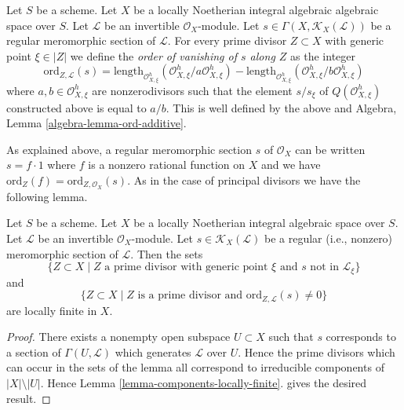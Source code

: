 \begin{definition}
\label{definition-order-vanishing-meromorphic}
Let $S$ be a scheme. Let $X$ be a locally Noetherian integral
algebraic algebraic space over $S$. Let $\mathcal{L}$ be an
invertible $\mathcal{O}_X$-module.
Let $s \in \Gamma(X, \mathcal{K}_X(\mathcal{L}))$
be a regular meromorphic section of $\mathcal{L}$.
For every prime divisor $Z \subset X$ with generic point $\xi \in |Z|$
we define the
{\it order of vanishing of $s$ along $Z$}
as the integer
$$
\text{ord}_{Z, \mathcal{L}}(s) =
\text{length}_{\mathcal{O}_{X, \xi}^h}
(\mathcal{O}_{X, \xi}^h/a \mathcal{O}_{X, \xi}^h) -
\text{length}_{\mathcal{O}_{X, \xi}^h}
(\mathcal{O}_{X, \xi}^h/b \mathcal{O}_{X, \xi}^h)
$$
where $a, b \in \mathcal{O}_{X, \xi}^h$ are nonzerodivisors
such that the element $s/s_\xi$ of $Q(\mathcal{O}_{X, \xi}^h)$
constructed above is equal to $a/b$.
This is well defined by the above and
Algebra, Lemma \ref{algebra-lemma-ord-additive}.
\end{definition}

\noindent
As explained above, a regular meromorphic section $s$ of $\mathcal{O}_X$
can be written $s = f \cdot 1$ where $f$
is a nonzero rational function on $X$ and we have
$\text{ord}_Z(f) = \text{ord}_{Z, \mathcal{O}_X}(s)$.
As in the case of principal divisors we have the following lemma.

\begin{lemma}
\label{lemma-divisor-meromorphic-locally-finite}
Let $S$ be a scheme. Let $X$ be a locally Noetherian integral algebraic space
over $S$. Let $\mathcal{L}$ be an invertible $\mathcal{O}_X$-module.
Let $s \in \mathcal{K}_X(\mathcal{L})$ be a
regular (i.e., nonzero) meromorphic section of $\mathcal{L}$. Then the sets
$$
\{Z \subset X \mid Z \text{ a prime divisor with generic point }\xi
\text{ and }s\text{ not in }\mathcal{L}_\xi\}
$$
and
$$
\{Z \subset X \mid Z \text{ is a prime divisor and }
\text{ord}_{Z, \mathcal{L}}(s) \not = 0\}
$$
are locally finite in $X$.
\end{lemma}

\begin{proof}
There exists a nonempty open subspace $U \subset X$ such that $s$
corresponds to a section of $\Gamma(U, \mathcal{L})$ which generates
$\mathcal{L}$ over $U$. Hence the prime divisors which can occur
in the sets of the lemma all correspond to irreducible components of
$|X| \setminus |U|$. Hence Lemma \ref{lemma-components-locally-finite}.
gives the desired result.
\end{proof}

